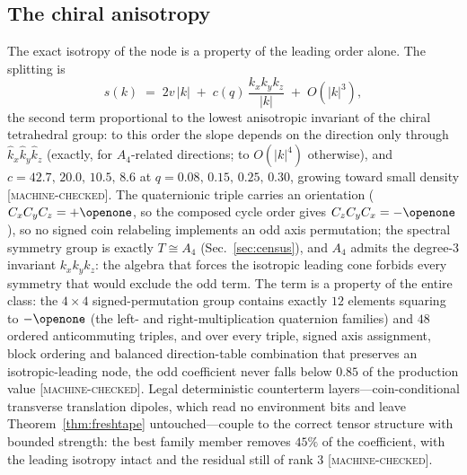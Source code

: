 \documentclass[aps,prd,twocolumn,superscriptaddress,nofootinbib,floatfix]{revtex4-2}
\newcommand{\evM}{\textnormal{\textsc{[machine-checked]}}}
\begin{document}
\subsection{The chiral anisotropy}
\label{sec:chiralaniso}

The exact isotropy of the node is a property of the leading order
alone. The splitting is
\begin{equation}
s(k)\;=\;2v\,|k|\;+\;c(q)\,\frac{k_xk_yk_z}{|k|}\;+\;O(|k|^3),
\label{eq:oddterm}
\end{equation}
the second term proportional to the lowest anisotropic invariant of
the chiral tetrahedral group: to this order the slope depends on the
direction only through $\hat k_x\hat k_y\hat k_z$ (exactly, for
$A_4$-related directions; to $O(|k|^4)$ otherwise), and
$c=42.7,\,20.0,\,10.5,\,8.6$ at $q=0.08,\,0.15,\,0.25,\,0.30$, growing
toward small density \evM{}. The quaternionic triple carries an
orientation ($C_xC_yC_z=+\openone$, so the composed cycle order gives
$C_zC_yC_x=-\openone$), so no signed coin relabeling
implements an odd axis permutation; the spectral symmetry group is
exactly $T\cong A_4$ (Sec.~\ref{sec:census}), and $A_4$ admits the
degree-3 invariant $k_xk_yk_z$: the algebra that forces the isotropic
leading cone forbids every symmetry that would exclude the odd term.
The term is a property of the entire class: the $4\times4$
signed-permutation group contains exactly $12$ elements squaring to
$-\openone$ (the left- and right-multiplication quaternion families)
and $48$ ordered anticommuting triples, and over every triple,
signed axis assignment, block ordering and balanced direction-table
combination that preserves an isotropic-leading node, the odd
coefficient never falls below $0.85$ of the production value \evM{}.
Legal deterministic counterterm layers---coin-conditional
transverse translation dipoles, which read no environment bits and
leave Theorem~\ref{thm:freshtape} untouched---couple to the
correct tensor structure with bounded strength: the best family
member removes $45\%$ of the coefficient, with the leading isotropy
intact and the residual still of rank 3 \evM{}.
\end{document}
